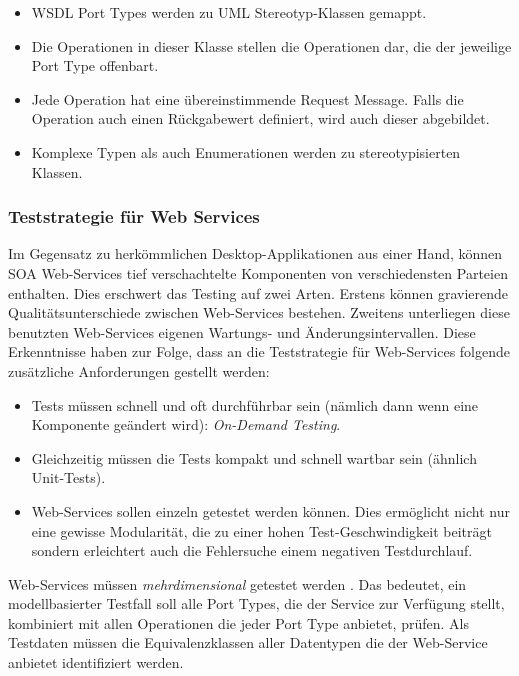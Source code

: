 \begin{itemize}
\item WSDL Port Types werden zu UML Stereotyp-Klassen gemappt.
\item Die Operationen in dieser Klasse stellen die Operationen dar, die der jeweilige Port Type offenbart.
\item Jede Operation hat eine übereinstimmende Request Message. Falls die Operation auch einen Rückgabewert definiert, wird auch dieser abgebildet.
\item Komplexe Typen als auch Enumerationen werden zu stereotypisierten Klassen.
\end{itemize}

\subsubsection{Teststrategie für Web Services}
Im Gegensatz zu herkömmlichen Desktop-Applikationen aus einer Hand, können SOA Web-Services tief verschachtelte Komponenten von verschiedensten Parteien enthalten. Dies erschwert das Testing auf zwei Arten. Erstens können gravierende Qualitätsunterschiede zwischen Web-Services bestehen. Zweitens unterliegen diese benutzten Web-Services eigenen Wartungs- und Änderungsintervallen. Diese Erkenntnisse haben zur Folge, dass an die Teststrategie für Web-Services folgende zusätzliche Anforderungen gestellt werden:

\begin{itemize}
\item Tests müssen schnell und oft durchführbar sein (nämlich dann wenn eine Komponente geändert wird): \textit{On-Demand Testing}.
\item Gleichzeitig müssen die Tests kompakt und schnell wartbar sein (ähnlich Unit-Tests).
\item Web-Services sollen einzeln getestet werden können. Dies ermöglicht nicht nur eine gewisse Modularität, die zu einer hohen Test-Geschwindigkeit beiträgt sondern erleichtert auch die Fehlersuche einem negativen Testdurchlauf.
\end{itemize}

Web-Services müssen \textit{mehrdimensional} getestet werden \cite{_model-driven_2007}. Das bedeutet, ein modellbasierter Testfall soll alle Port Types, die der Service zur Verfügung stellt, kombiniert mit allen Operationen die jeder Port Type anbietet, prüfen. Als Testdaten müssen die Equivalenzklassen  aller Datentypen die der Web-Service anbietet identifiziert werden.

